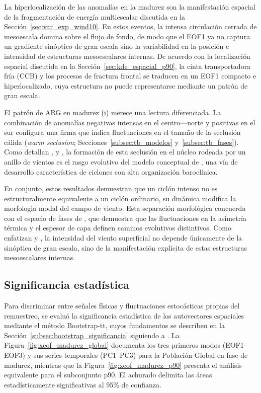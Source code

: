 La hiperlocalización de las anomalías en la madurez son la manifestación espacial de la fragmentación de energía multiescalar discutida en la Sección~\ref{sec:var_exp_wind10}. 
En estos eventos, la intensa circulación cerrada de mesoescala domina sobre el flujo de fondo, de modo que el EOF1 ya no captura un gradiente sinóptico de gran escala sino la variabilidad en la posición e intensidad de estructuras mesoescalares internas. 
De acuerdo con la localización espacial discutida en la Sección~\ref{sec:kde_espacial_p90}, la cinta transportadora fría (CCB) y los procesos de fractura frontal se traducen en un EOF1 compacto e hiperlocalizado, cuya estructura no puede representarse mediante un patrón de gran escala.

El patrón de ARG en madurez (i) merece una lectura diferenciada. 
La combinación de anomalías negativas intensas en el centro---norte y positivas en el sur configura una firma que indica fluctuaciones en el tamaño de la seclusión cálida (\textit{warm seclusion}; Secciones~\ref{subsec:tb_modelos} y~\ref{subsec:tb_fases}).
Como detallan \citet{schultz2021antecedents}, \citet{reboita2022from} y \citet{shapiro1999bridge}, la formación de esta seclusión en el núcleo rodeada por un anillo de vientos es el rasgo evolutivo del modelo conceptual de \citet{shapiro1990life}, una vía de desarrollo característica de ciclones con alta organización baroclínica.

En conjunto, estos resultados demuestran que un ciclón intenso no es estructuralmente equivalente a un ciclón ordinario, su dinámica modifica la morfologia modal del campo de viento. 
Esta separación morfológica concuerda con el espacio de fases de \citet{hart2003cyclone}, que demuestra que las fluctuaciones en la asimetría térmica y
el espesor de capa definen caminos evolutivos distintivos. 
Como enfatizan \citet{corner2025classification} y \citet{eisenstein2023identification}, la intensidad del viento superficial no depende únicamente de la sinóptica de gran escala, sino de la manifestación explícita de estas estructuras mesoescalares internas.
\subsection{Significancia estadística}\label{subsec:res_significancia_madurez}

Para discriminar entre señales físicas y fluctuaciones estocásticas propias del remuestreo, se evaluó la significancia estadística de los autovectores espaciales mediante el método Bootstrap-tt, cuyos fundamentos se describen en la Sección~\ref{subsec:bootstrap_significancia} siguiendo a \citet{hesterberg2015bootstrap}.
La Figura~\ref{fig:xeof_madurez_global} documenta los tres primeros modos (EOF1--EOF3) y sus series temporales (PC1--PC3) para la Población Global en fase de madurez, mientras que la Figura~\ref{fig:xeof_madurez_p90} presenta el análisis equivalente para el subconjunto p90. 
El achurado delimita las áreas estadísticamente significativas al 95\% de confianza.

